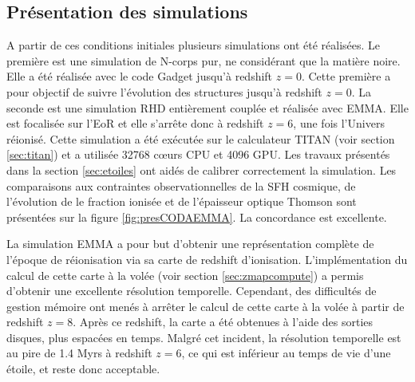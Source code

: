 \subsection{Présentation des simulations}
\label{sec:presCODA}

A partir de ces conditions initiales plusieurs simulations ont été réalisées.
Le première est une simulation de N-corps pur, ne considérant que la matière noire.
Elle a été réalisée avec le code Gadget \citep{springel_cosmological_2005} jusqu'à redshift $z=0$.
Cette première a pour objectif de suivre l'évolution des structures jusqu'à redshift $z=0$.
La seconde est une simulation \ac{RHD} entièrement couplée et réalisée avec EMMA.
Elle est focalisée sur l'\ac{EoR} et elle s’arrête donc à redshift $z=6$, une fois l'Univers réionisé.
Cette simulation a été exécutée sur le calculateur TITAN (voir section \ref{sec:titan}) et a utilisée 32768 cœurs \ac{CPU} et 4096 \ac{GPU}.
Les travaux présentés dans la section \ref{sec:etoiles} ont aidés de calibrer correctement la simulation.
Les comparaisons aux contraintes observationnelles de la \ac{SFH} cosmique, de l'évolution de le fraction ionisée et de l'épaisseur optique Thomson sont présentées sur la figure \ref{fig:presCODAEMMA}. 
La concordance est excellente.

La simulation EMMA a pour but d'obtenir une représentation complète de l'époque de réionisation via sa carte de redshift d'ionisation.
L'implémentation du calcul de cette carte à la volée (voir section \ref{sec:zmapcompute}) a permis d'obtenir une excellente résolution temporelle.
Cependant, des difficultés de gestion mémoire ont menés à arrêter le calcul de cette carte à la volée à partir de redshift $z=8$.
Après ce redshift, la carte a été obtenues à l'aide des sorties disques, plus espacées en temps.
Malgré cet incident, la résolution temporelle est au pire de 1.4 Myrs à redshift $z=6$, ce qui est inférieur au temps de vie d'une étoile, et reste donc acceptable.


